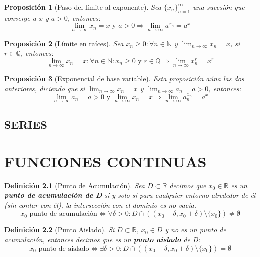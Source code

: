 \documentclass[10pt,a4paper,openright]{book}
\newtheorem{proposicion}{Proposición}[chapter]
\newtheorem{definicion}{Definición}[chapter]
\begin{document}
\begin{proposicion}[Paso del límite al exponente]
Sea $\{x_n\}_{n=1}^\infty$ una sucesión que converge a $x$ y $a>0$, entonces:
$$\lim_{n\rightarrow \infty} x_n = x \mbox{ y }a>0\Rightarrow \lim_{n\rightarrow\infty} a^{x_n}=a^x$$
\end{proposicion}

\begin{proposicion}[Límite en raíces]
Sea $x_n\geq 0: \forall n\in \mathbb N$ y $\lim_{n\rightarrow\infty} x_n = x$, si $r\in \mathbb Q$, entonces:
$$\lim_{n\rightarrow \infty}x_n = x: \forall n\in \mathbb N: x_n\geq 0 \mbox{ y }r\in \mathbb Q\Rightarrow \lim_{n\rightarrow\infty}x_n^{r} = x^r$$
\end{proposicion}

\begin{proposicion}[Exponencial de base variable]
Esta proposición aúna las dos anteriores, diciendo que si $\lim_{n\rightarrow \infty}x_n = x$ y $\lim_{n\rightarrow\infty}a_n=a>0$, entonces:
$$\lim_{n\rightarrow\infty}a_n=a>0 \mbox{ y } \lim_{n\rightarrow\infty}x_n=x\Rightarrow \lim_{n\rightarrow\infty}a_n^{x_n}=a^x$$
\end{proposicion}

\section{SERIES}

\chapter{FUNCIONES CONTINUAS}
\begin{definicion}[Punto de Acumulación]
Sea $D\subset \mathbb R$ decimos que $x_0\in \mathbb R$ es un \textbf{punto de acumulación de D} si y solo si para cualquier entorno alrededor de él (sin contar con él), la intersección con el dominio es no vacía.
$$x_0 \mbox{ punto de acumulación}\Leftrightarrow \forall \delta>0: D\cap \left((x_0-\delta, x_0+\delta)\mbox{\textbackslash} \{x_0\}\right)\neq \emptyset$$
\end{definicion}

\begin{definicion}[Punto Aislado]
Si $D\subset \mathbb R$, $x_0\in D$ y no es un punto de acumulación, entonces decimos que es un \textbf{punto aislado} de D:
$$x_0 \mbox{ punto de aislado}\Leftrightarrow\exists \delta >0 : D\cap \left((x_0-\delta, x_0+\delta)\mbox{\textbackslash} \{x_0\}\right)= \emptyset$$
\end{definicion}
\end{document}
